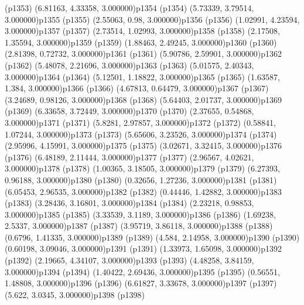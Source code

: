 \psdot(p1353)
\psPoint(6.81163, 4.33358, 3.000000){p1354}
\psdot(p1354)
\psPoint(5.73339, 3.79514, 3.000000){p1355}
\psdot(p1355)
\psPoint(2.55063, 0.98, 3.000000){p1356}
\psdot(p1356)
\psPoint(1.02991, 4.23594, 3.000000){p1357}
\psdot(p1357)
\psPoint(2.73514, 1.02993, 3.000000){p1358}
\psdot(p1358)
\psPoint(2.17508, 1.35594, 3.000000){p1359}
\psdot(p1359)
\psPoint(1.88463, 2.49245, 3.000000){p1360}
\psdot(p1360)
\psPoint(2.81398, 0.72732, 3.000000){p1361}
\psdot(p1361)
\psPoint(5.90786, 2.59901, 3.000000){p1362}
\psdot(p1362)
\psPoint(5.48078, 2.21696, 3.000000){p1363}
\psdot(p1363)
\psPoint(5.01575, 2.40343, 3.000000){p1364}
\psdot(p1364)
\psPoint(5.12501, 1.18822, 3.000000){p1365}
\psdot(p1365)
\psPoint(1.63587, 1.384, 3.000000){p1366}
\psdot(p1366)
\psPoint(4.67813, 0.64479, 3.000000){p1367}
\psdot(p1367)
\psPoint(3.24689, 0.98126, 3.000000){p1368}
\psdot(p1368)
\psPoint(5.64403, 2.01737, 3.000000){p1369}
\psdot(p1369)
\psPoint(6.33658, 3.72449, 3.000000){p1370}
\psdot(p1370)
\psPoint(2.37655, 0.54868, 3.000000){p1371}
\psdot(p1371)
\psPoint(5.8281, 2.97857, 3.000000){p1372}
\psdot(p1372)
\psPoint(0.58841, 1.07244, 3.000000){p1373}
\psdot(p1373)
\psPoint(5.65606, 3.23526, 3.000000){p1374}
\psdot(p1374)
\psPoint(2.95996, 4.15991, 3.000000){p1375}
\psdot(p1375)
\psPoint(3.02671, 3.32415, 3.000000){p1376}
\psdot(p1376)
\psPoint(6.48189, 2.11444, 3.000000){p1377}
\psdot(p1377)
\psPoint(2.96567, 4.02621, 3.000000){p1378}
\psdot(p1378)
\psPoint(1.00365, 3.18505, 3.000000){p1379}
\psdot(p1379)
\psPoint(6.27393, 0.96188, 3.000000){p1380}
\psdot(p1380)
\psPoint(0.32656, 1.27236, 3.000000){p1381}
\psdot(p1381)
\psPoint(6.05453, 2.96535, 3.000000){p1382}
\psdot(p1382)
\psPoint(0.44446, 1.42882, 3.000000){p1383}
\psdot(p1383)
\psPoint(3.28436, 3.16801, 3.000000){p1384}
\psdot(p1384)
\psPoint(2.23218, 0.98853, 3.000000){p1385}
\psdot(p1385)
\psPoint(3.33539, 3.1189, 3.000000){p1386}
\psdot(p1386)
\psPoint(1.69238, 2.5337, 3.000000){p1387}
\psdot(p1387)
\psPoint(3.95719, 3.86118, 3.000000){p1388}
\psdot(p1388)
\psPoint(0.6796, 1.41335, 3.000000){p1389}
\psdot(p1389)
\psPoint(4.584, 2.14958, 3.000000){p1390}
\psdot(p1390)
\psPoint(0.60198, 3.09046, 3.000000){p1391}
\psdot(p1391)
\psPoint(1.33973, 1.65098, 3.000000){p1392}
\psdot(p1392)
\psPoint(2.19665, 4.34107, 3.000000){p1393}
\psdot(p1393)
\psPoint(4.48258, 3.84159, 3.000000){p1394}
\psdot(p1394)
\psPoint(1.40422, 2.69436, 3.000000){p1395}
\psdot(p1395)
\psPoint(0.56551, 1.48808, 3.000000){p1396}
\psdot(p1396)
\psPoint(6.61827, 3.33678, 3.000000){p1397}
\psdot(p1397)
\psPoint(5.622, 3.0345, 3.000000){p1398}
\psdot(p1398)
